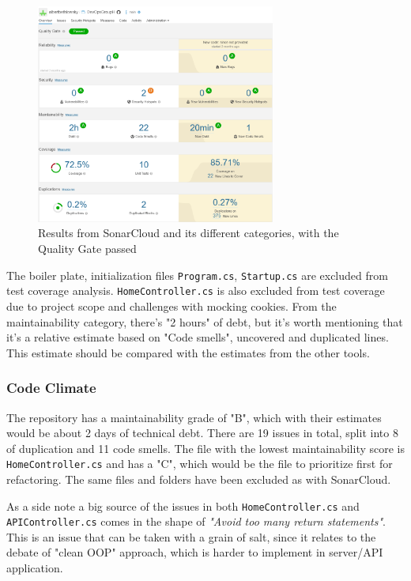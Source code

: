 \documentclass{article}
\begin{document}
\begin{figure}[H]
\centering
\includegraphics[width=0.7\textwidth]{images/sonarcloud.png}
\caption{\label{fig:dep1} Results from SonarCloud and its different categories, with the Quality Gate passed}
\end{figure}

The boiler plate, initialization files \texttt{Program.cs}, \texttt{Startup.cs} are excluded from test coverage analysis. \texttt{HomeController.cs} is also excluded from test coverage due to project scope and challenges with mocking cookies.
From the maintainability category, there's "2 hours" of debt, but it's worth mentioning that it's a relative estimate based on "Code smells", uncovered and duplicated lines. This estimate should be compared with the estimates from the other tools.   
\subsubsection*{Code Climate}
The repository has a maintainability grade of "B", which with their estimates would be about 2 days of technical debt. There are 19 issues in total, split into 8 of duplication and 11 code smells. The file with the lowest maintainability score is \texttt{HomeController.cs} and has a "C", which would be the file to prioritize first for refactoring. The same files and folders have been excluded as with SonarCloud. %

As a side note a big source of the issues in both \texttt{HomeController.cs} and \texttt{APIController.cs} comes in the shape of \textit{"Avoid too many return statements"}. This is an issue that can be taken with a grain of salt, since it relates to the debate of "clean OOP" approach, which is harder to implement in server/API application. %
\end{document}
